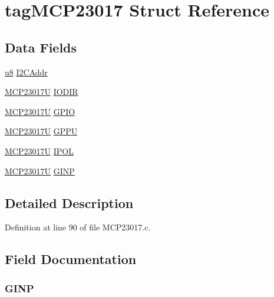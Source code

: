 \hypertarget{structtag_m_c_p23017}{\section{tag\-M\-C\-P23017 Struct Reference}
\label{structtag_m_c_p23017}
}
\subsection*{Data Fields}
\begin{DoxyCompactItemize}
\item 
\hyperlink{p8_2pinguino_2core_2typedef_8h_aed742c436da53c1080638ce6ef7d13de}{u8} \hyperlink{structtag_m_c_p23017_a525e929bfd993f97bf03022b3d01e334}{I2\-C\-Addr}
\item 
\hyperlink{_m_c_p23017_8c_afa3cb46cd17f03f8dccea8f5f26028bc}{M\-C\-P23017\-U} \hyperlink{structtag_m_c_p23017_a917722aa77aab52a7482a0c9efc2cf8a}{I\-O\-D\-I\-R}
\item 
\hyperlink{_m_c_p23017_8c_afa3cb46cd17f03f8dccea8f5f26028bc}{M\-C\-P23017\-U} \hyperlink{structtag_m_c_p23017_a8bf9a3a47fd6ef498c3f5506bad2fbdc}{G\-P\-I\-O}
\item 
\hyperlink{_m_c_p23017_8c_afa3cb46cd17f03f8dccea8f5f26028bc}{M\-C\-P23017\-U} \hyperlink{structtag_m_c_p23017_a37c518ef28e3e0bcd2ab58ebd39ed543}{G\-P\-P\-U}
\item 
\hyperlink{_m_c_p23017_8c_afa3cb46cd17f03f8dccea8f5f26028bc}{M\-C\-P23017\-U} \hyperlink{structtag_m_c_p23017_a39ac5b9ee3d963ab62dbbd439d543430}{I\-P\-O\-L}
\item 
\hyperlink{_m_c_p23017_8c_afa3cb46cd17f03f8dccea8f5f26028bc}{M\-C\-P23017\-U} \hyperlink{structtag_m_c_p23017_a26b7f687ee41850a3b8fd313a6ccd42c}{G\-I\-N\-P}
\end{DoxyCompactItemize}


\subsection{Detailed Description}


Definition at line 90 of file M\-C\-P23017.\-c.



\subsection{Field Documentation}
\hypertarget{structtag_m_c_p23017_a26b7f687ee41850a3b8fd313a6ccd42c}{
\subsubsection[{G\-I\-N\-P}]{ G\-I\-N\-P}}\label{structtag_m_c_p23017_a26b7f687ee41850a3b8fd313a6ccd42c}


